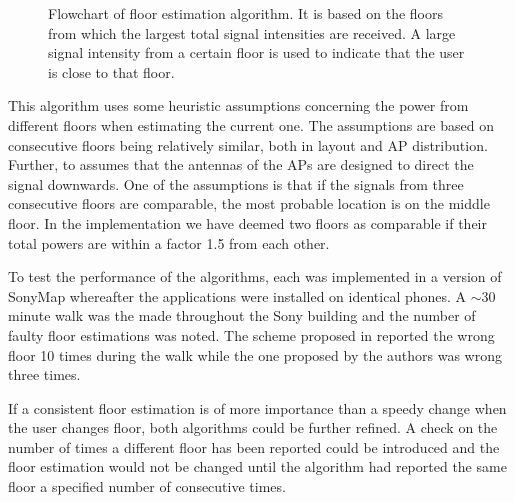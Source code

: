 \documentclass{LTHthesis}
\begin{document}
\begin{figure}
  \caption{Flowchart of floor estimation algorithm. It is based on the floors from which the largest total signal intensities are received. A large signal intensity from a certain floor is used to indicate that the user is close to that floor.} \label{flowchart}
\end{figure}

This algorithm uses some heuristic assumptions concerning the power from different floors when estimating the current one. The assumptions are based on consecutive floors being relatively similar, both in layout and AP distribution. Further, to assumes that the antennas of the APs are designed to direct the signal downwards. One of the assumptions is that if the signals from three consecutive floors are comparable, the most probable location is on the middle floor. In the implementation we have deemed two floors as comparable if their total powers are within a factor 1.5 from each other.  

To test the performance of the algorithms, each was implemented in a version of SonyMap whereafter the applications were installed on identical phones. A $\sim$30 minute walk was the made throughout the Sony building and the number of faulty floor estimations was noted. The scheme proposed in \cite{floor_det} reported the wrong floor 10 times during the walk while the one proposed by the authors was wrong three times. 

If a consistent floor estimation is of more importance than a speedy change when the user changes floor, both algorithms could be further refined. A check on the number of times a different floor has been reported could be introduced and the floor estimation would not be changed until the algorithm had reported the same floor a specified number of consecutive times.    
\end{document}
